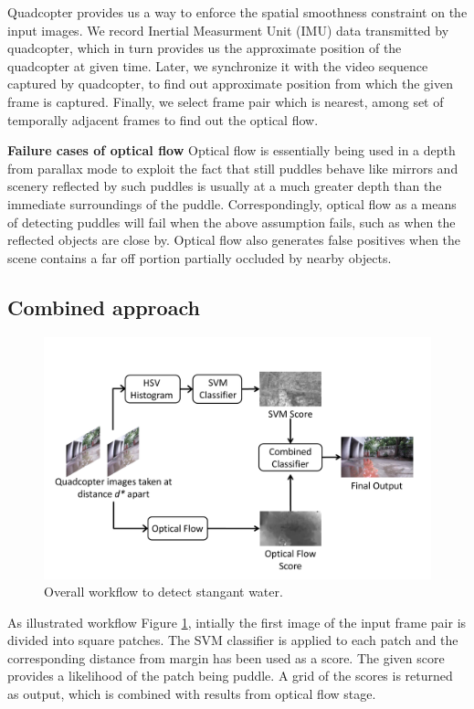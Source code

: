 \documentclass[times,10pt,twocolumn,letterpaper]{article}
\begin{document}
Quadcopter provides us a way to enforce the spatial smoothness constraint on
the input images. We record Inertial Measurment Unit (IMU) data
transmitted by quadcopter, which in turn provides us the approximate position of
the quadcopter at given time. Later, we synchronize it with the video sequence
captured by quadcopter, to find out approximate position from which the given
frame is captured. Finally, we select frame pair which is nearest, among set of
temporally adjacent frames to find out the optical flow.

\textbf{Failure cases of optical flow}
Optical flow is essentially being used in a depth from parallax mode to exploit
the fact that still puddles behave like mirrors and scenery reflected by such
puddles is usually at a much greater depth than the immediate surroundings of
the puddle. Correspondingly, optical flow as a means of detecting puddles will
fail when the above assumption fails, such as when the reflected objects are
close by. Optical flow also generates false positives when the scene contains a
far off portion partially occluded by nearby objects.
 

\subsection{Combined approach}
\begin{figure}[h!]
\centering
\includegraphics[width=\linewidth]{images/overall_workflow.pdf}
\caption{Overall workflow to detect stangant water.}
\label{fig:workflow}
\end{figure}

As illustrated workflow Figure \ref{fig:workflow}, intially the first image of
the input frame pair is divided into square patches. The SVM classifier is
applied to each patch and the corresponding distance from margin has been used
as a score. The given score provides a likelihood of the patch being puddle. A
grid of the scores is returned as output, which is combined with results from
optical flow stage.
\end{document}
